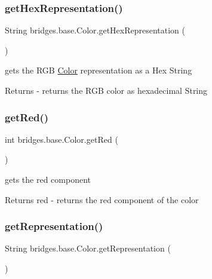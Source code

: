\subsubsection{\texorpdfstring{getHexRepresentation()}{getHexRepresentation()}}
{\footnotesize\ttfamily String bridges.\+base.\+Color.\+get\+Hex\+Representation (\begin{DoxyParamCaption}{ }\end{DoxyParamCaption})}

gets the R\+GB \mbox{\hyperlink{classbridges_1_1base_1_1_color}{Color}} representation as a Hex String

\begin{DoxyReturn}{Returns}
-\/ returns the R\+GB color as hexadecimal String 
\end{DoxyReturn}
\mbox{\label{classbridges_1_1base_1_1_color_af1a30dc925b35d6bfe609f8838651025}} 
\subsubsection{\texorpdfstring{getRed()}{getRed()}}
{\footnotesize\ttfamily int bridges.\+base.\+Color.\+get\+Red (\begin{DoxyParamCaption}{ }\end{DoxyParamCaption})}

gets the red component

\begin{DoxyReturn}{Returns}
red -\/ returns the red component of the color 
\end{DoxyReturn}
\mbox{\label{classbridges_1_1base_1_1_color_a2f9b0cb588e49b2ebf2f015d4d7507d0}} 
\subsubsection{\texorpdfstring{getRepresentation()}{getRepresentation()}}
{\footnotesize\ttfamily String bridges.\+base.\+Color.\+get\+Representation (\begin{DoxyParamCaption}{ }\end{DoxyParamCaption})}

